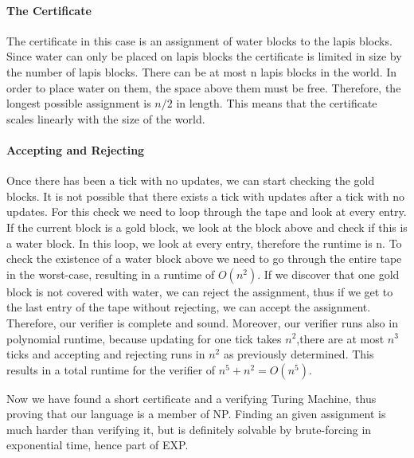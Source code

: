 	\paragraph{The Certificate}
	The certificate in this case is an assignment of water blocks to the lapis blocks.
	Since water can only be placed on lapis blocks the certificate is limited in size by the number of lapis blocks.
	There can be at most n lapis blocks in the world. In order to place water on them, the space above them must be free.
	Therefore, the longest possible assignment is $n/2$ in length. This means that the certificate scales linearly with the size of the world.
	
	
 	\paragraph{Accepting and Rejecting}
	Once there has been a tick with no updates, we can start checking the gold blocks. It is not possible that there exists a tick with updates after a tick with no updates. For this check we need to loop through the tape and look at every entry. If the current block is a gold block, we look at the block above and check if this is a water block. In this loop, we look at every entry, therefore the runtime is n. To check the existence of a water block above we need to go through the entire tape in the worst-case, resulting in a runtime of $O(n^{2})$. If we discover that one gold block is not covered with water, we can reject the assignment, thus if we get to the last entry of the tape without rejecting, we can accept the assignment. Therefore, our verifier is complete and sound. Moreover, our verifier runs also in polynomial runtime, because updating for one tick takes $n^{2}$,there are at most $n^{3}$ ticks and accepting and rejecting runs in $n^{2}$ as previously determined. This results in a total runtime for the verifier of $n^5 + n^2 = O(n^5)$.
	
	
	Now we have found a short certificate and a verifying Turing Machine, thus proving that our language is a member of NP. Finding an given assignment is much harder than verifying it, but is definitely solvable by brute-forcing in exponential time, hence part of EXP.
